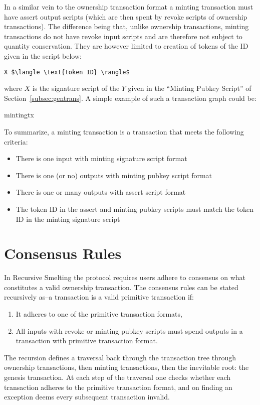 \documentclass[9pt,oneside]{amsart}
\begin{document}
\begin{multicols}{2}
In a similar vein to the ownership transaction format a minting transaction must have assert output scripts (which are then spent by revoke scripts of ownership transactions). The difference being that, unlike ownership transactions, minting transactions do not have revoke input scripts and are therefore not subject to quantity conservation. They are however limited to creation of tokens of the ID given in the script below:

\begin{lstlisting}[title={\textbf{Minting Signature Script}}]
X $\langle \text{token ID} \rangle$
\end{lstlisting}
where $X$ is the signature script of the $Y$ given in the ``Minting Pubkey Script'' of Section~\ref{subsec:gentrans}. A simple example of such a transaction graph could be:
\begin{center}
{mintingtx}
\end{center}

To summarize, a minting transaction is a transaction that meets the following criteria:
\begin{itemize}
    \item There is one input with minting signature script format
    \item There is one (or no) outputs with minting pubkey script format
    \item There is one or many outputs with assert script format
    \item The token ID in the assert and minting pubkey scripts must match the token ID in the minting signature script
\end{itemize}

\section{Consensus Rules}
In Recursive Smelting the protocol requires users adhere to consensus on what constitutes a valid ownership transaction. The consensus rules can be stated recursively as--a  transaction is a valid primitive transaction if:
    \begin{enumerate}
        \item It adheres to one of the primitive transaction formats,
        \item All inputs with revoke or minting pubkey scripts must  spend outputs in a transaction with primitive transaction format.
    \end{enumerate}

The recursion defines a traversal back through the transaction tree through ownership transactions, then minting transactions, then the inevitable root: the genesis transaction. At each step of the traversal one checks whether each transaction adheres to the primitive transaction format, and on finding an exception deems every subsequent transaction invalid.


\end{multicols}
\end{document}

